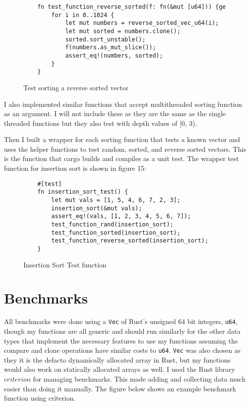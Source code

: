 \documentclass[12pt,letterpaper]{report}
\newcommand{\rust}[1]{\texttt{#1}}
\begin{document}
	\begin{figure}[H]
	\begin{verbatim}
    fn test_function_reverse_sorted(f: fn(&mut [u64])) {ge
        for i in 0..1024 {
            let mut numbers = reverse_sorted_vec_u64(i);
            let mut sorted = numbers.clone();
            sorted.sort_unstable();
            f(numbers.as_mut_slice());
            assert_eq!(numbers, sorted);
        }
    }
 	\end{verbatim}
     \caption{Test sorting a reverse sorted vector}
\end{figure}

	I also implemented similar functions that accept multithreaded sorting function as an argument. I will not include these as they are the same as the single threaded functions but they also test with depth values of [0, 3).

	Then I built a wrapper for each sorting function that tests a known vector and uses the helper functions to test random, sorted, and reverse sorted vectors. This is the function that cargo builds and compiles as a unit test. The wrapper test function for insertion sort is shown in figure 15:

	\begin{figure}[H]
	\begin{verbatim}
    #[test]
    fn insertion_sort_test() {
        let mut vals = [1, 5, 4, 6, 7, 2, 3];
        insertion_sort(&mut vals);
        assert_eq!(vals, [1, 2, 3, 4, 5, 6, 7]);
        test_function_rand(insertion_sort);
        test_function_sorted(insertion_sort);
        test_function_reverse_sorted(insertion_sort);
    }
	\end{verbatim}
    \caption{Insertion Sort Test function}
\end{figure}

		
\newpage

	\section*{Benchmarks}
	
	All benchmarks were done using a \rust{Vec} of Rust's unsigned 64 bit integers, \rust{u64}, though my functions are all generic and should run similarly for the other data types that implement the necessary features to use my functions assuming the compare and clone operations have similar costs to \rust{u64}. \rust{Vec} was also chosen as they it is the defacto dynamically allocated array in Rust, but my functions would also work on statically allocated arrays as well. I used the Rust library $criterion$ for managing benchmarks. This made adding and collecting data much easier than doing it manually. The figure below shows an example benchmark function using criterion.
\end{document}

